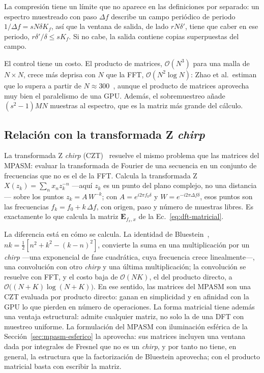 La compresión tiene un límite que no aparece en las definiciones por separado: un
espectro muestreado con paso $\Delta f$ describe un campo periódico de periodo
$1/\Delta f = sN\delta K_f$, así que la ventana de salida, de lado
$rN\delta'$, tiene que caber en ese periodo, $r\delta'/\delta \le sK_f$. Si no
cabe, la salida contiene copias superpuestas del campo.

El control tiene un costo. El producto de matrices, $\mathcal{O}(N^3)$ para
una malla de $N\times N$, crece más deprisa con $N$ que la FFT,
$\mathcal{O}(N^2\log N)$: Zhao et al.\ estiman que lo
supera a partir de $N \approx 300$~\cite{zhao2020}, aunque el producto de
matrices aprovecha muy bien el paralelismo de una GPU. Además, el sobremuestreo
añade $(s^2 - 1)MN$ muestras al espectro, que es la matriz más grande del
cálculo.

\subsection{Relación con la transformada Z \emph{chirp}}
\label{sec:czt-teoria}

La transformada Z \emph{chirp} (CZT)~\cite{rabiner1969} resuelve el mismo
problema que las matrices del MPASM: evaluar la transformada de Fourier de una
secuencia en un conjunto de frecuencias que no es el de la FFT. Calcula la
transformada Z $X(z_k) = \sum_n x_n z_k^{-n}$ ---aquí $z_k$ es un punto del
plano complejo, no una distancia--- sobre los puntos
$z_k = A\,W^{-k}$; con $A = e^{i2\pi f_0\delta}$ y $W = e^{-i2\pi\Delta f\delta}$,
esos puntos son las frecuencias $f_k = f_0 + k\,\Delta f$, con origen, paso y
número de muestras libres. Es exactamente lo que calcula la matriz
$\mathbf{E}_{f_x,x}$ de la Ec.~\eqref{eq:dft-matricial}.

La diferencia está en cómo se calcula. La identidad de
Bluestein~\cite{bluestein1970}, $nk = \frac{1}{2}\left[n^2 + k^2 - (k - n)^2\right]$,
convierte la suma en una multiplicación por un \emph{chirp} ---una exponencial
de fase cuadrática, cuya frecuencia crece linealmente---, una convolución
con otro \emph{chirp} y una última multiplicación; la convolución se resuelve
con FFT, y el costo baja de $\mathcal{O}(NK)$, el del producto directo, a
$\mathcal{O}\big((N + K)\log(N + K)\big)$. En ese sentido, las matrices del
MPASM son una CZT evaluada por producto directo: ganan en simplicidad y en
afinidad con la GPU lo que pierden en número de operaciones. La forma matricial
tiene además una ventaja estructural: admite cualquier matriz, no solo la de
una DFT con muestreo uniforme. La formulación del MPASM con iluminación
esférica de la Sección~\ref{sec:mpasm-esferico} la aprovecha: sus matrices
incluyen una ventana dada por integrales de Fresnel que no es un \emph{chirp},
y por tanto no tiene, en general, la estructura que la factorización de
Bluestein aprovecha; con el producto matricial basta con escribir la matriz.

